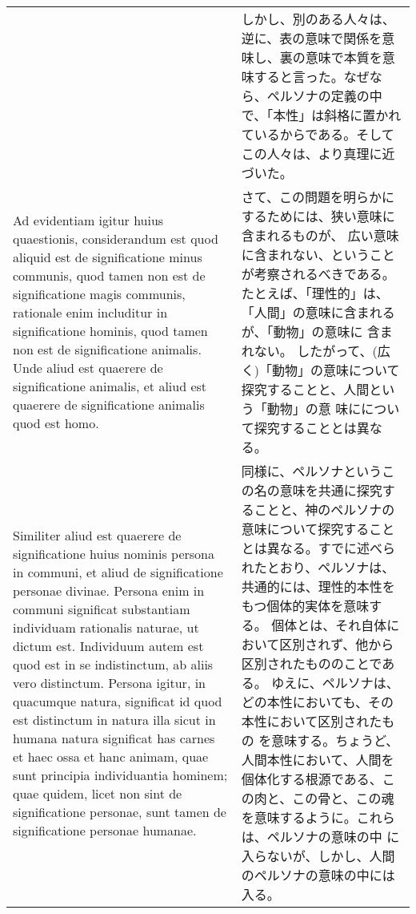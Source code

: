 \documentclass[10pt]{jsarticle} %
\begin{document}
\begin{longtable}{p{21em}p{21em}}
&

しかし、別のある人々は、逆に、表の意味で関係を意味し、裏の意味で本質を意
 味すると言った。なぜなら、ペルソナの定義の中で、「本性」は斜格に置かれ
 ているからである。そしてこの人々は、より真理に近づいた。


\\

Ad evidentiam igitur huius
quaestionis, considerandum est quod aliquid est de significatione minus
communis, quod tamen non est de significatione magis communis, rationale
enim includitur in significatione hominis, quod tamen non est de
significatione animalis. 
Unde aliud est quaerere de significatione
animalis, et aliud est quaerere de significatione animalis quod est
homo.

&

さて、この問題を明らかにするためには、狭い意味に含まれるものが、
広い意味に含まれない、ということが考察されるべきである。
 たとえば、「理性的」は、「人間」の意味に含まれるが、「動物」の意味に
 含まれない。
したがって、(広く)「動物」の意味について探究することと、人間という「動物」の意
 味にについて探究することとは異なる。

\\


 Similiter aliud est quaerere de significatione huius nominis
persona in communi, et aliud de significatione personae divinae. Persona
enim in communi significat substantiam individuam rationalis naturae, ut
dictum est. 
Individuum autem est quod est in se indistinctum, ab aliis
vero distinctum. Persona igitur, in quacumque natura, significat id quod
est distinctum in natura illa sicut in humana natura significat has
carnes et haec ossa et hanc animam, quae sunt principia individuantia
hominem; quae quidem, licet non sint de significatione personae, sunt
tamen de significatione personae humanae. 


&

同様に、ペルソナというこの名の意味を共通に探究することと、神のペルソナの
 意味について探究することとは異なる。すでに述べられたとおり、ペルソナは、
 共通的には、理性的本性をもつ個体的実体を意味する。
個体とは、それ自体において区別されず、他から区別されたもののことである。
 ゆえに、ペルソナは、どの本性においても、その本性において区別されたもの
 を意味する。ちょうど、人間本性において、人間を個体化する根源である、こ
 の肉と、この骨と、この魂を意味するように。これらは、ペルソナの意味の中
 に入らないが、しかし、人間のペルソナの意味の中には入る。

\\





\end{longtable}
\end{document}

